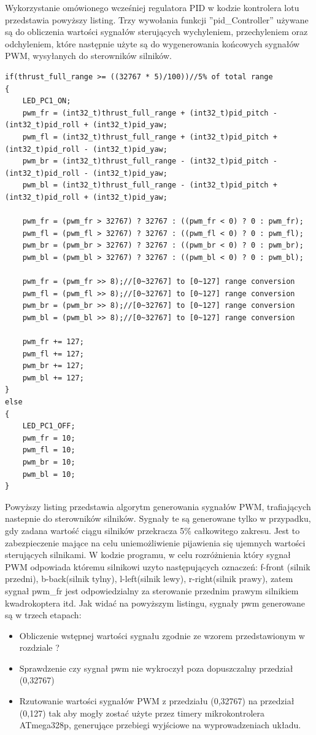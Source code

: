Wykorzystanie omówionego wcześniej regulatora PID w kodzie kontrolera lotu przedstawia powyższy listing. Trzy wywołania funkcji ''pid\_Controller'' używane są do obliczenia wartości sygnałów sterujących wychyleniem, przechyleniem oraz odchyleniem, które następnie użyte są do wygenerowania końcowych sygnałów PWM, wysyłanych do sterowników silników. 

\begin{lstlisting}
if(thrust_full_range >= ((32767 * 5)/100))//5% of total range
{
	LED_PC1_ON;
	pwm_fr = (int32_t)thrust_full_range + (int32_t)pid_pitch - (int32_t)pid_roll + (int32_t)pid_yaw;
	pwm_fl = (int32_t)thrust_full_range + (int32_t)pid_pitch + (int32_t)pid_roll - (int32_t)pid_yaw;
	pwm_br = (int32_t)thrust_full_range - (int32_t)pid_pitch - (int32_t)pid_roll - (int32_t)pid_yaw;
	pwm_bl = (int32_t)thrust_full_range - (int32_t)pid_pitch + (int32_t)pid_roll + (int32_t)pid_yaw;

	pwm_fr = (pwm_fr > 32767) ? 32767 : ((pwm_fr < 0) ? 0 : pwm_fr); 
	pwm_fl = (pwm_fl > 32767) ? 32767 : ((pwm_fl < 0) ? 0 : pwm_fl); 
	pwm_br = (pwm_br > 32767) ? 32767 : ((pwm_br < 0) ? 0 : pwm_br);
	pwm_bl = (pwm_bl > 32767) ? 32767 : ((pwm_bl < 0) ? 0 : pwm_bl);

	pwm_fr = (pwm_fr >> 8);//[0~32767] to [0~127] range conversion
	pwm_fl = (pwm_fl >> 8);//[0~32767] to [0~127] range conversion
	pwm_br = (pwm_br >> 8);//[0~32767] to [0~127] range conversion
	pwm_bl = (pwm_bl >> 8);//[0~32767] to [0~127] range conversion

	pwm_fr += 127;
	pwm_fl += 127;
	pwm_br += 127;
	pwm_bl += 127;
}
else
{
	LED_PC1_OFF;
	pwm_fr = 10;
	pwm_fl = 10;
	pwm_br = 10;
	pwm_bl = 10;
}
\end{lstlisting}

Powyższy listing przedstawia algorytm generowania sygnałów PWM, trafiających nastepnie do sterowników silników. Sygnały te są generowane tylko w przypadku, gdy zadana wartość ciągu silników przekracza 5\% całkowitego zakresu. Jest to zabezpieczenie mające na celu uniemożliwienie pijawienia się ujemnych wartości sterujących silnikami. W kodzie programu, w celu rozróżnienia który sygnał PWM odpowiada któremu silnikowi uzyto następujących oznaczeń: f-front (silnik przedni), b-back(silnik tylny), l-left(silnik lewy), r-right(silnik prawy), zatem sygnał pwm\_fr jest odpowiedzialny za sterowanie przednim prawym silnikiem kwadrokoptera itd. Jak widać na powyższym listingu, sygnały pwm generowane są w trzech etapach:
\begin{itemize}
	\item Obliczenie wstępnej wartości sygnału zgodnie ze wzorem przedstawionym w rozdziale ?
	\item Sprawdzenie czy sygnał pwm nie wykroczył poza dopuszczalny przedział (0,32767)
	\item Rzutowanie wartości sygnałów PWM z przedziału (0,32767) na przedział (0,127) tak aby mogły zostać użyte przez timery mikrokontrolera ATmega328p, generujące przebiegi wyjściowe na wyprowadzeniach układu. 
\end{itemize}


